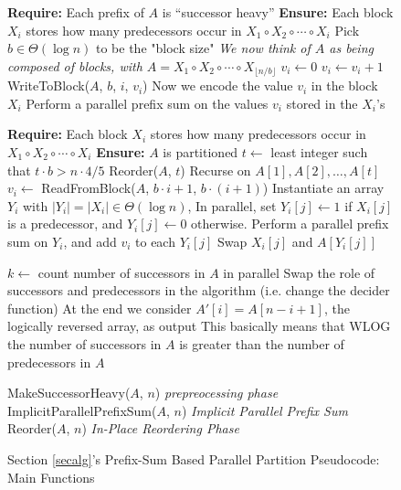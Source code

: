 \documentclass[twoside,leqno,twocolumn]{article}
\begin{document}
\begin{figure*}
  \caption{Section \ref{secalg}'s Prefix-Sum Based Parallel Partition Pseudocode: Main Functions}
  \label{alg:parallelPartition_prefixsumbased_main}
  \begin{algorithmic} %
    \State \textbf{Require: } Each prefix of $A$ is ``successor heavy''
    \State \textbf{Ensure: }  Each block $X_i$ stores how many predecessors occur in $X_1 \circ X_2 \circ \cdots \circ X_i$
      \State Pick $b \in \Theta(\log n)$ to be the "block size"
      \Comment \textit{We now think of $A$ as being composed of blocks, with $A = X_1 \circ X_2 \circ \cdots \circ X_{\lfloor n/b \rfloor}$}
        \State $v_i \gets 0$  
            \State $v_i \gets v_i + 1$
          \EndIf
        \EndFor
        \State WriteToBlock($A$, $b$, $i$, $v_i$)
        \Comment Now we encode the value $v_i$ in the block $X_i$
      \EndFor
      \State Perform a parallel prefix sum on the values $v_i$ stored in the $X_i$'s
   \EndProcedure
    \State

  \State \textbf{Require: } Each block $X_i$ stores how many predecessors occur in $X_1 \circ X_2 \circ \cdots \circ X_i$
  \State \textbf{Ensure: }  $A$ is partitioned
      \State $t \gets $ least integer such that $t\cdot b > n\cdot 4/5$
      \State Reorder($A$, $t$)
      \Comment Recurse on $A[1], A[2], \ldots, A[t]$
      \State $v_i \gets$ ReadFromBlock($A$, $b\cdot i+1$, $b\cdot(i+1)$) 
        \State Instantiate an array $Y_i$ with $|Y_i| = |X_i| \in \Theta(\log n)$, 
        \State In parallel, set $Y_i[j] \gets 1$ if $X_i[j]$ is a predecessor, and $Y_i[j] \gets 0$ otherwise.
        \State Perform a parallel prefix sum on $Y_i$, and add $v_i$ to each $Y_i[j]$
            \State Swap $X_i[j]$ and $A[Y_i[j]]$
          \EndIf
        \EndFor
      \EndFor
    \EndProcedure
    \State

      \State $k \gets$ count number of successors in $A$ in parallel
        \State Swap the role of successors and predecessors in the algorithm (i.e. change the decider function)
        \State At the end we consider $A'[i] = A[n-i+1]$, the logically reversed array, as output
        \State This basically means that WLOG the number of successors in $A$ is greater than the number of predecessors in $A$
      \EndIf

      \State MakeSuccessorHeavy($A$, $n$) \Comment \textit{prepreocessing phase}
      \State ImplicitParallelPrefixSum($A$, $n$) \Comment \textit{Implicit Parallel Prefix Sum}
      \State Reorder($A$, $n$) \Comment \textit{In-Place Reordering Phase}
    \EndProcedure
  \end{algorithmic}	
\end{figure*}

\clearpage
\clearpage



\end{document}
